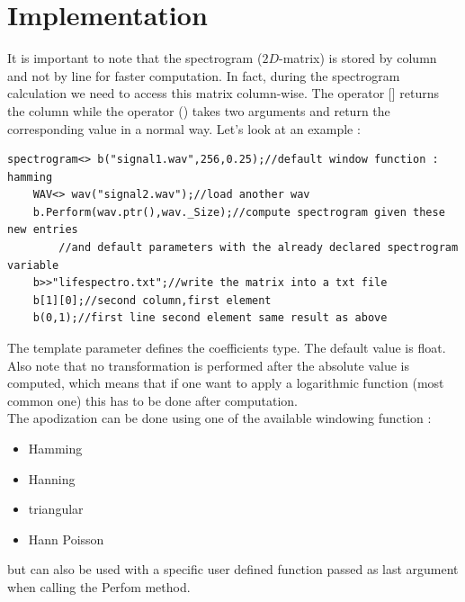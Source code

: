 \documentclass[a4paper]{report}
\begin{document}
\section{Implementation}
It is important to note that the spectrogram ($2D$-matrix) is stored by column and not by line for faster computation. In fact, during the spectrogram calculation we need to access this matrix column-wise. The operator [] returns the column while the operator () takes two arguments and return the corresponding value in a normal way. Let's look at an example :

\begin{lstlisting}[basicstyle=\tiny]
    spectrogram<> b("signal1.wav",256,0.25);//default window function : hamming
    WAV<> wav("signal2.wav");//load another wav
    b.Perform(wav.ptr(),wav._Size);//compute spectrogram given these new entries
        //and default parameters with the already declared spectrogram variable
    b>>"lifespectro.txt";//write the matrix into a txt file
    b[1][0];//second column,first element
    b(0,1);//first line second element same result as above
\end{lstlisting}

The template parameter defines the coefficients type. The default value is float. Also note that no transformation is performed after the absolute value is computed, which means that if one want to apply a logarithmic function (most common one) this has to be done after computation. 
\\
The apodization can be done using one of the available windowing function : 
\begin{itemize}
\item Hamming
\item Hanning
\item triangular
\item Hann Poisson
\end{itemize}
but can also be used with a specific user defined function passed as last argument when calling the Perfom method.
\end{document}

